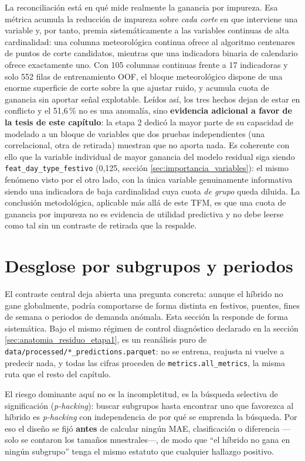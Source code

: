 La reconciliación está en qué mide
realmente la ganancia por impureza. Esa métrica acumula la reducción de impureza sobre
\emph{cada corte} en que interviene una variable y, por tanto, premia sistemáticamente a
las variables continuas de alta cardinalidad: una columna meteorológica continua ofrece al
algoritmo centenares de puntos de corte candidatos, mientras que una indicadora binaria de
calendario ofrece exactamente uno. Con 105 columnas continuas frente a 17 indicadoras y
solo 552 filas de entrenamiento OOF, el bloque meteorológico dispone de una enorme
superficie de corte sobre la que ajustar ruido, y acumula cuota de ganancia sin aportar
señal explotable. Leídos así, los tres hechos dejan de estar en conflicto y el 51,6\,\% no
es una anomalía, sino \textbf{evidencia adicional a favor de la tesis de este capítulo}: la
etapa 2 dedicó la mayor parte de su capacidad de modelado a un bloque de variables que dos
pruebas independientes (una correlacional, otra de retirada) muestran que no aporta nada.
Es coherente con ello que la variable individual de mayor ganancia del modelo residual siga
siendo \texttt{feat\_day\_type\_festivo} (0,125, sección \ref{sec:importancia_variables}):
el mismo fenómeno visto por el otro lado, con la única variable genuinamente informativa
siendo una indicadora de baja cardinalidad cuya cuota \emph{de grupo} queda diluida. La
conclusión metodológica, aplicable más allá de este TFM, es que una cuota de ganancia por
impureza no es evidencia de utilidad predictiva y no debe leerse como tal sin un
contraste de retirada que la respalde.

\section{Desglose por subgrupos y periodos}\label{sec:desglose_subgrupos}

El contraste central deja abierta una pregunta concreta: aunque el híbrido no gane globalmente, podría
comportarse de forma distinta en festivos, puentes, fines de semana o periodos de demanda
anómala. Esta sección la responde de forma sistemática. Bajo el mismo régimen de
control diagnóstico declarado en la sección \ref{sec:anatomia_residuo_etapa1}, es un
reanálisis puro de \texttt{data/\allowbreak{}processed/\allowbreak{}*\_predictions.parquet}:
no se entrena, reajusta ni vuelve a predecir nada, y todas las cifras proceden de
\texttt{metrics.all\_metrics}, la misma ruta que el resto del capítulo.

El riesgo dominante aquí no es la incompletitud, es la búsqueda selectiva de significación (\emph{p-hacking}): buscar subgrupos
hasta encontrar uno que favorezca al híbrido es \emph{p-hacking} con independencia de por
qué se emprenda la búsqueda. Por eso el diseño se fijó \textbf{antes} de calcular ningún MAE, clasificación
o diferencia —solo se contaron los tamaños muestrales—, de modo que ``el híbrido no gana en
ningún subgrupo'' tenga el mismo estatuto que cualquier hallazgo positivo.


